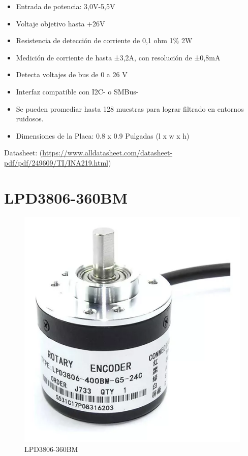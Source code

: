                 \begin{itemize}[label=•]
                    \setlength{\itemindent}{2em}
                    
                    \item Entrada de potencia: 3,0V-5,5V\par
                    \item Voltaje objetivo hasta +26V\par
                    \item Resistencia de detección de corriente de 0,1 ohm 1\% 2W\par
                    \item Medición de corriente de hasta ±3,2A, con resolución de ±0,8mA\par
                    \item Detecta voltajes de bus de 0 a 26 V\par
                    \item Interfaz compatible con I2C- o SMBus-\par
                    \item Se pueden promediar hasta 128 muestras para lograr filtrado en entornos ruidosos.\par
                    \item Dimensiones de la Placa: 0.8 x 0.9 Pulgadas (l x w x h)\par
                \end{itemize}
            
                Datasheet: (\href{https://www.alldatasheet.com/datasheet-pdf/pdf/249609/TI/INA219.html}{https://www.alldatasheet.com/datasheet-pdf/pdf/249609/TI/INA219.html})\par

        \newpage
        
        \section{LPD3806-360BM}
        \label{encoder}
        
                \begin{figure}[!ht]
                \centering
                \includegraphics[width=0.5\linewidth]{Anexo_C/Encoder.png}
            \caption{LPD3806-360BM}
            \label{fig:c3}
        \end{figure}
        
